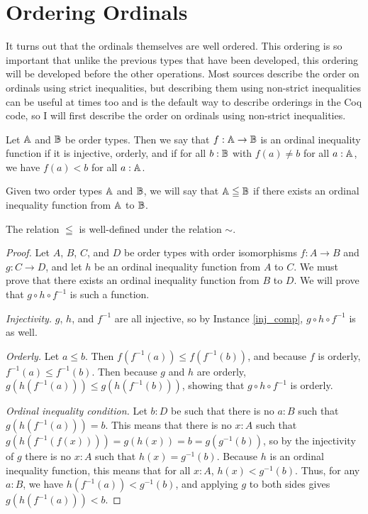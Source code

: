 \documentclass[../../math.tex]{subfiles}
\begin{document}
\section{Ordering Ordinals}

It turns out that the ordinals themselves are well ordered.  This ordering is so
important that unlike the previous types that have been developed, this ordering
will be developed before the other operations.  Most sources describe the order
on ordinals using strict inequalities, but describing them using non-strict
inequalities can be useful at times too and is the default way to describe
orderings in the Coq code, so I will first describe the order on ordinals using
non-strict inequalities.

\begin{definition}
    Let $\mathbb{A}$ and $\mathbb{B}$ be order types.  Then we say that $f : \mathbb{A} \to \mathbb{B}$ is an
    ordinal inequality function if it is injective, orderly, and if for all $b :
    \mathbb{B}$ with $f(a) \neq b$ for all $a : \mathbb{A}$, we have $f(a) < b$ for all $a :
    \mathbb{A}$.
\end{definition}

\begin{definition}
    Given two order types $\mathbb{A}$ and $\mathbb{B}$, we will say that $\mathbb{A} \leqq \mathbb{B}$ if there
    exists an ordinal inequality function from $\mathbb{A}$ to $\mathbb{B}$.
\end{definition}

\begin{lemma}
    The relation $\leqq$ is well-defined under the relation $\sim$.
\end{lemma}
\begin{proof}
    Let $A$, $B$, $C$, and $D$ be order types with order isomorphisms $f : A \to
    B$ and $g : C \to D$, and let $h$ be an ordinal inequality function from $A$
    to $C$.  We must prove that there exists an ordinal inequality function from
    $B$ to $D$.  We will prove that $g \circ h \circ f^{-1}$ is such a function.

    \noindent \textit{Injectivity.}
    $g$, $h$, and $f^{-1}$ are all injective, so by Instance \ref{inj_comp}, $g
    \circ h \circ f^{-1}$ is as well.

    \noindent \textit{Orderly.}
    Let $a \leq b$.  Then $f(f^{-1}(a)) \leq f(f^{-1}(b))$, and because $f$ is
    orderly, $f^{-1}(a) \leq f^{-1}(b)$.  Then because $g$ and $h$ are orderly,
    $g(h(f^{-1}(a))) \leq g(h(f^{-1}(b)))$, showing that $g \circ h \circ
    f^{-1}$ is orderly.

    \noindent \textit{Ordinal inequality condition.}
    Let $b : D$ be such that there is no $a : B$ such that $g(h(f^{-1}(a))) =
    b$.  This means that there is no $x : A$ such that $g(h(f^{-1}(f(x)))) =
    g(h(x)) = b = g(g^{-1}(b))$, so by the injectivity of $g$ there is no $x :
    A$ such that $h(x) = g^{-1}(b)$.  Because $h$ is an ordinal inequality
    function, this means that for all $x : A$, $h(x) < g^{-1}(b)$.  Thus, for
    any $a : B$, we have $h(f^{-1}(a)) < g^{-1}(b)$, and applying $g$ to both
    sides gives $g(h(f^{-1}(a))) < b$.
\end{proof}
\end{document}
